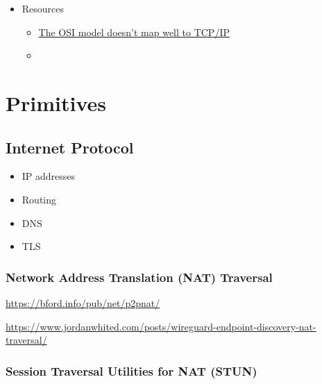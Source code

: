 \begin{itemize}
\tightlist
\item
  Resources

  \begin{itemize}
  \tightlist
  \item
    \href{https://jvns.ca/blog/2021/05/11/what-s-the-osi-model-/}{The
    OSI model doesn't map well to TCP/IP}
  \item
  \end{itemize}
\end{itemize}

\hypertarget{primitives}{%
\section{Primitives}\label{primitives}}

\hypertarget{internet-protocol}{%
\subsection{Internet Protocol}\label{internet-protocol}}

\begin{itemize}
\tightlist
\item
  IP addresses
\item
  Routing
\item
  DNS
\item
  TLS
\end{itemize}

\hypertarget{network-address-translation-nat-traversal}{%
\subsubsection{Network Address Translation (NAT)
Traversal}\label{network-address-translation-nat-traversal}}

\url{https://bford.info/pub/net/p2pnat/}

\url{https://www.jordanwhited.com/posts/wireguard-endpoint-discovery-nat-traversal/}

\hypertarget{session-traversal-utilities-for-nat-stun}{%
\subsubsection{Session Traversal Utilities for NAT
(STUN)}\label{session-traversal-utilities-for-nat-stun}}

